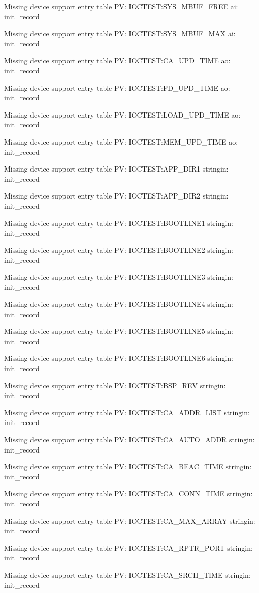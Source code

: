 Missing device support entry table PV: IOCTEST:SYS_MBUF_FREE ai: init_record

Missing device support entry table PV: IOCTEST:SYS_MBUF_MAX ai: init_record

Missing device support entry table PV: IOCTEST:CA_UPD_TIME ao: init_record

Missing device support entry table PV: IOCTEST:FD_UPD_TIME ao: init_record

Missing device support entry table PV: IOCTEST:LOAD_UPD_TIME ao: init_record

Missing device support entry table PV: IOCTEST:MEM_UPD_TIME ao: init_record

Missing device support entry table PV: IOCTEST:APP_DIR1 stringin: init_record

Missing device support entry table PV: IOCTEST:APP_DIR2 stringin: init_record

Missing device support entry table PV: IOCTEST:BOOTLINE1 stringin: init_record

Missing device support entry table PV: IOCTEST:BOOTLINE2 stringin: init_record

Missing device support entry table PV: IOCTEST:BOOTLINE3 stringin: init_record

Missing device support entry table PV: IOCTEST:BOOTLINE4 stringin: init_record

Missing device support entry table PV: IOCTEST:BOOTLINE5 stringin: init_record

Missing device support entry table PV: IOCTEST:BOOTLINE6 stringin: init_record

Missing device support entry table PV: IOCTEST:BSP_REV stringin: init_record

Missing device support entry table PV: IOCTEST:CA_ADDR_LIST stringin: init_record

Missing device support entry table PV: IOCTEST:CA_AUTO_ADDR stringin: init_record

Missing device support entry table PV: IOCTEST:CA_BEAC_TIME stringin: init_record

Missing device support entry table PV: IOCTEST:CA_CONN_TIME stringin: init_record

Missing device support entry table PV: IOCTEST:CA_MAX_ARRAY stringin: init_record

Missing device support entry table PV: IOCTEST:CA_RPTR_PORT stringin: init_record

Missing device support entry table PV: IOCTEST:CA_SRCH_TIME stringin: init_record

